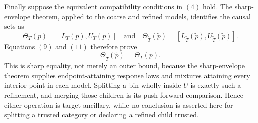 Finally suppose the equivalent compatibility conditions in \((4)\) hold.  The sharp-envelope theorem, applied to the coarse and refined models, identifies the causal sets as
\[
 \Theta_T(p)=[L_T(p),U_T(p)]
 \quad\text{and}\quad
 \Theta_{\widetilde T}(\widetilde p)
   =[L_{\widetilde T}(\widetilde p),U_{\widetilde T}(\widetilde p)].
\]
Equations \((9)\) and \((11)\) therefore prove
\[
 \Theta_{\widetilde T}(\widetilde p)=\Theta_T(p).
\]
This is sharp equality, not merely an outer bound, because the sharp-envelope theorem supplies endpoint-attaining response laws and mixtures attaining every interior point in each model.  Splitting a bin wholly inside \(U\) is exactly such a refinement, and merging those children is its push-forward comparison.  Hence either operation is target-ancillary, while no conclusion is asserted here for splitting a trusted category or declaring a refined child trusted.
